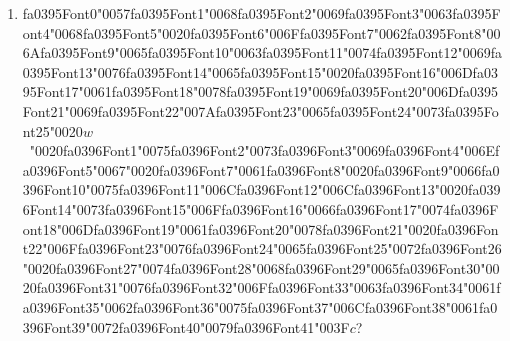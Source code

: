 \documentclass[12pt]{article}
\begin{document}
\begin{enumerate}[label=Q\arabic*.]
 \item {\csname fa0395Font0\endcsname\char"0057}{\csname fa0395Font1\endcsname\char"0068}{\csname fa0395Font2\endcsname\char"0069}{\csname fa0395Font3\endcsname\char"0063}{\csname fa0395Font4\endcsname\char"0068}{\csname fa0395Font5\endcsname\char"0020}{\csname fa0395Font6\endcsname\char"006F}{\csname fa0395Font7\endcsname\char"0062}{\csname fa0395Font8\endcsname\char"006A}{\csname fa0395Font9\endcsname\char"0065}{\csname fa0395Font10\endcsname\char"0063}{\csname fa0395Font11\endcsname\char"0074}{\csname fa0395Font12\endcsname\char"0069}{\csname fa0395Font13\endcsname\char"0076}{\csname fa0395Font14\endcsname\char"0065}{\csname fa0395Font15\endcsname\char"0020}{\csname fa0395Font16\endcsname\char"006D}{\csname fa0395Font17\endcsname\char"0061}{\csname fa0395Font18\endcsname\char"0078}{\csname fa0395Font19\endcsname\char"0069}{\csname fa0395Font20\endcsname\char"006D}{\csname fa0395Font21\endcsname\char"0069}{\csname fa0395Font22\endcsname\char"007A}{\csname fa0395Font23\endcsname\char"0065}{\csname fa0395Font24\endcsname\char"0073}{\csname fa0395Font25\endcsname\char"0020}$w$\ {\char"0020}{\csname fa0396Font1\endcsname\char"0075}{\csname fa0396Font2\endcsname\char"0073}{\csname fa0396Font3\endcsname\char"0069}{\csname fa0396Font4\endcsname\char"006E}{\csname fa0396Font5\endcsname\char"0067}{\char"0020}{\csname fa0396Font7\endcsname\char"0061}{\csname fa0396Font8\endcsname\char"0020}{\csname fa0396Font9\endcsname\char"0066}{\csname fa0396Font10\endcsname\char"0075}{\csname fa0396Font11\endcsname\char"006C}{\csname fa0396Font12\endcsname\char"006C}{\csname fa0396Font13\endcsname\char"0020}{\csname fa0396Font14\endcsname\char"0073}{\csname fa0396Font15\endcsname\char"006F}{\csname fa0396Font16\endcsname\char"0066}{\csname fa0396Font17\endcsname\char"0074}{\csname fa0396Font18\endcsname\char"006D}{\csname fa0396Font19\endcsname\char"0061}{\csname fa0396Font20\endcsname\char"0078}{\csname fa0396Font21\endcsname\char"0020}{\csname fa0396Font22\endcsname\char"006F}{\csname fa0396Font23\endcsname\char"0076}{\csname fa0396Font24\endcsname\char"0065}{\csname fa0396Font25\endcsname\char"0072}{\csname fa0396Font26\endcsname\char"0020}{\csname fa0396Font27\endcsname\char"0074}{\csname fa0396Font28\endcsname\char"0068}{\csname fa0396Font29\endcsname\char"0065}{\csname fa0396Font30\endcsname\char"0020}{\csname fa0396Font31\endcsname\char"0076}{\csname fa0396Font32\endcsname\char"006F}{\csname fa0396Font33\endcsname\char"0063}{\csname fa0396Font34\endcsname\char"0061}{\csname fa0396Font35\endcsname\char"0062}{\csname fa0396Font36\endcsname\char"0075}{\csname fa0396Font37\endcsname\char"006C}{\csname fa0396Font38\endcsname\char"0061}{\csname fa0396Font39\endcsname\char"0072}{\csname fa0396Font40\endcsname\char"0079}{\csname fa0396Font41\endcsname\char"003F}$c$?

\end{enumerate}
\end{document}
